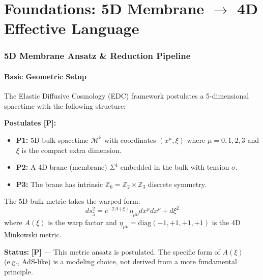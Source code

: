 \documentclass[11pt,a4paper]{article}
\newcommand{\tagP}{\textcolor{red!70!black}{\textbf{[P]}}}
\begin{document}
\newpage
\tableofcontents
\newpage


\part{Foundations: 5D Membrane $\to$ 4D Effective Language}

\section{5D Membrane Ansatz \& Reduction Pipeline}
\label{sec:5D_ansatz}

\subsection{Basic Geometric Setup}

The Elastic Diffusive Cosmology (EDC) framework postulates a 5-dimensional spacetime with the following structure:

\begin{statusbox}
\textbf{Postulates [P]:}
\begin{itemize}
    \item \textbf{P1:} 5D bulk spacetime $\mathcal{M}^5$ with coordinates $(x^\mu, \xi)$ where $\mu = 0,1,2,3$ and $\xi$ is the compact extra dimension.
    \item \textbf{P2:} A 4D brane (membrane) $\Sigma^4$ embedded in the bulk with tension $\sigma$.
    \item \textbf{P3:} The brane has intrinsic $\mathbb{Z}_6 = \mathbb{Z}_2 \times \mathbb{Z}_3$ discrete symmetry.
\end{itemize}
\end{statusbox}

The 5D bulk metric takes the warped form:
\begin{equation}
    ds^2_5 = e^{-2A(\xi)} \eta_{\mu\nu} dx^\mu dx^\nu + d\xi^2
    \label{eq:bulk_metric}
\end{equation}
where $A(\xi)$ is the warp factor and $\eta_{\mu\nu} = \text{diag}(-1, +1, +1, +1)$ is the 4D Minkowski metric.

\textbf{Status:} \tagP{} --- This metric ansatz is postulated. The specific form of $A(\xi)$ (e.g., AdS-like) is a modeling choice, not derived from a more fundamental principle.
\end{document}
